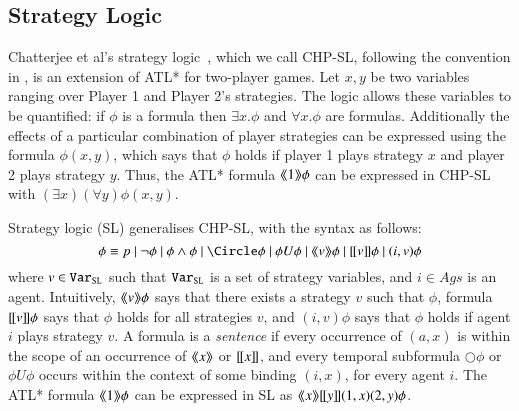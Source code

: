 \documentclass[a4wide]{article}
\newcommand{\until}{U}
\theoremstyle{examplesty}
\newcommand{\Ags}{\mathit{Ags}}
\newcommand{\atlop}[1]{\langle\hspace{-2pt}\langle #1 \rangle \hspace{-2pt}\rangle }
\newcommand{\atluop}[1]{[\hspace{-1pt}[ #1]\hspace{-1pt}]}
\newcommand{\nxt}{\Circle}
\begin{document}
\newcommand{\str}{{\tt Str}}
\newcommand{\trlsl}[2]{#2^{#1}} 
\newcommand{\assignedAgents}{*}
\newcommand{\slvar}{{\tt Var_{SL}}}

\subsection{Strategy Logic}\label{sec:sl} 


Chatterjee et al's strategy logic~\cite{CHP10}, which we call CHP-SL, 
 following the convention in \cite{MogaveroMV10}, is an extension of ATL* for two-player games. Let $x,y$ be two variables 
ranging 
 over Player 1 and Player 2's strategies. 
The logic allows these variables to be quantified: if $\phi $ is a formula then $\exists x.\phi$ and $\forall x.\phi$ are formulas. 
Additionally the effects of a particular combination of player strategies can be expressed using the formula $\phi(x,y)$, which 
says that $\phi$ holds if player 1 plays strategy $x$ and player 2 plays strategy $y$. 
Thus, the ATL* formula $\atlop{1}{\phi}$ can be expressed in CHP-SL with $(\exists x)(\forall y)\phi(x,y)$. 
 
Strategy logic (SL) \cite{MogaveroMV10} generalises CHP-SL, with the syntax as follows: 
$$
\phi \equiv p ~|~\neg \phi~|~ \phi \land \phi ~|~ \nxt \phi~|~\phi \until \phi~|~\atlop{v}\phi~|~\atluop{v}\phi~|~(i,v)\phi
$$
where $v\in \slvar$ such that $\slvar$ is a set of strategy variables, and $i\in\Ags$ is an agent. 
Intuitively, $\atlop{v}\phi$ says that there exists a strategy $v$ such that $\phi$, 
formula $\atluop{v}\phi$ says that $\phi$ holds for all strategies $v$, 
and $(i,v)\phi$ says that $\phi$ holds if agent $i$ plays  strategy $v$. 
A formula is a \emph{sentence} if every occurrence of $(a,x)$ is within the scope of an occurrence of $\atlop{x}$ or $\atluop{x}$, 
and every temporal subformula $ \nxt \phi$ or  $\phi \until \phi$ occurs within the context of some binding $(i,x)$, for every agent $i$. 
The ATL* formula $\atlop{1}{\phi}$ can be expressed in SL as  $\atlop{x}\atluop{y}(1,x) (2,y) \phi$. 
\end{document}
